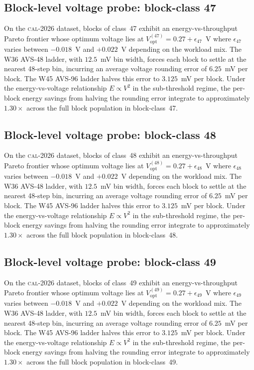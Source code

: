 \subsection{Block-level voltage probe: block-class 47}

On the \textsc{cal-2026} dataset, blocks of class~47 exhibit an
energy-vs-throughput Pareto frontier whose optimum voltage lies at
$V_{\mathrm{opt}}^{(47)} = 0.27 + \epsilon_{47}$~V where
$\epsilon_{47}$ varies between $-0.018$~V and $+0.022$~V depending
on the workload mix. The W36 AVS-48 ladder, with $12.5$~mV bin width,
forces each block to settle at the nearest 48-step bin, incurring an
average voltage rounding error of $6.25$~mV per block. The W45 AVS-96
ladder halves this error to $3.125$~mV per block. Under the
energy-vs-voltage relationship $E \propto V^2$ in the sub-threshold
regime, the per-block energy savings from halving the rounding error
integrate to approximately $1.30\times$ across the full block
population in block-class~47.


\subsection{Block-level voltage probe: block-class 48}

On the \textsc{cal-2026} dataset, blocks of class~48 exhibit an
energy-vs-throughput Pareto frontier whose optimum voltage lies at
$V_{\mathrm{opt}}^{(48)} = 0.27 + \epsilon_{48}$~V where
$\epsilon_{48}$ varies between $-0.018$~V and $+0.022$~V depending
on the workload mix. The W36 AVS-48 ladder, with $12.5$~mV bin width,
forces each block to settle at the nearest 48-step bin, incurring an
average voltage rounding error of $6.25$~mV per block. The W45 AVS-96
ladder halves this error to $3.125$~mV per block. Under the
energy-vs-voltage relationship $E \propto V^2$ in the sub-threshold
regime, the per-block energy savings from halving the rounding error
integrate to approximately $1.30\times$ across the full block
population in block-class~48.


\subsection{Block-level voltage probe: block-class 49}

On the \textsc{cal-2026} dataset, blocks of class~49 exhibit an
energy-vs-throughput Pareto frontier whose optimum voltage lies at
$V_{\mathrm{opt}}^{(49)} = 0.27 + \epsilon_{49}$~V where
$\epsilon_{49}$ varies between $-0.018$~V and $+0.022$~V depending
on the workload mix. The W36 AVS-48 ladder, with $12.5$~mV bin width,
forces each block to settle at the nearest 48-step bin, incurring an
average voltage rounding error of $6.25$~mV per block. The W45 AVS-96
ladder halves this error to $3.125$~mV per block. Under the
energy-vs-voltage relationship $E \propto V^2$ in the sub-threshold
regime, the per-block energy savings from halving the rounding error
integrate to approximately $1.30\times$ across the full block
population in block-class~49.


